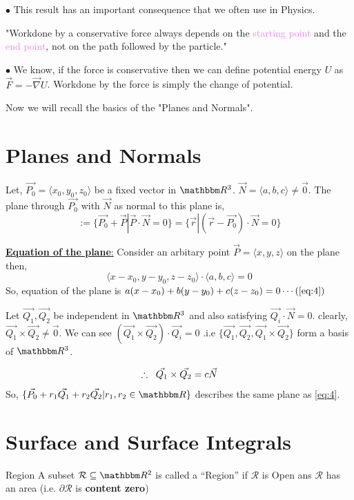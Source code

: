\documentclass[Analysis-3]{subfiles}
\begin{document}
$\bullet$ This result has an important consequence that we often use in Physics. 

 "Workdone by a conservative force always depends on the \textcolor{violet}{starting point} and the \textcolor{violet}{end point}, not on the path followed by the particle." 
\vspace*{0.2cm}

$\bullet$ We know, if the force is conservative then we can define potential energy $U$ as $ \vec{F} = -\vec{\nabla }U$. Workdone by the force is simply the change of potential.

\vspace*{0.2cm}

Now we will recall the basics of the "Planes and Normals".

\vspace*{0.2cm}

\section{Planes and Normals}
Let, $\vec{P_0} = \langle x_0,y_0,z_0 \rangle$ be a fixed vector in $\R^3$. $\vec{N} = \langle a,b,c \rangle \neq \vec{0}$. The plane through $\vec{P_0}$ with $\vec{N}$ as normal to this plane is,
$$ := \{\vec{P_0} + \vec{P} | \vec{P}\cdot \vec{N} = 0\} = \{\vec{r} | (\vec{r}-\vec{P_0})\cdot \vec{N} = 0 \} $$

\underline{\textbf{Equation of the plane}:} Consider an  arbitary point $\vec{P} = \langle x,y,z\rangle$ on the plane then, $$\langle x-x_0,y-y_0,z-z_0\rangle \cdot \langle a,b,c \rangle = 0$$
So, equation of the plane is $a(x-x_0)+b(y-y_0) +c(z-z_0)= 0 \cdots \label{eq:4} (\ref{eq:4})$

  \vspace{1cm}

Let $\vec{Q_1},\vec{Q_2}$ be independent in $\R^3$ and also satisfying $\vec{Q_i} \cdot \vec{N} = 0$. clearly, $\vec{Q_1}\times \vec{Q_2} \neq \vec{0}$. We can see $(\vec{Q_1}\times \vec{Q_2}) \cdot \vec{Q_i} = 0$ .i.e $\{\vec{Q_1},\vec{Q_2},\vec{Q_1}\times \vec{Q_2}\}$ form a basis of $\R^3$. 

$$\therefore \hspace{0.2cm}\vec{Q_1}\times \vec{Q_2} = c \vec{N}$$
So, $\{\vec{P_0} + r_1 \vec{Q_1} + r_2 \vec{Q_2} | r_1,r_2 \in \R \}$ describes the same plane as \ref{eq:4}. 

\section{Surface and Surface Integrals}
\begin{Def}{Region}{}
    A subset $\mathcal{R} \subseteq \R^2$ is called a \enquote{Region} if $\mathcal{R}$ is Open ans $\mathcal{R}$ has an area (i.e. $\partial \mathcal{R}$ is \textbf{content zero})
\end{Def}
\end{document}
